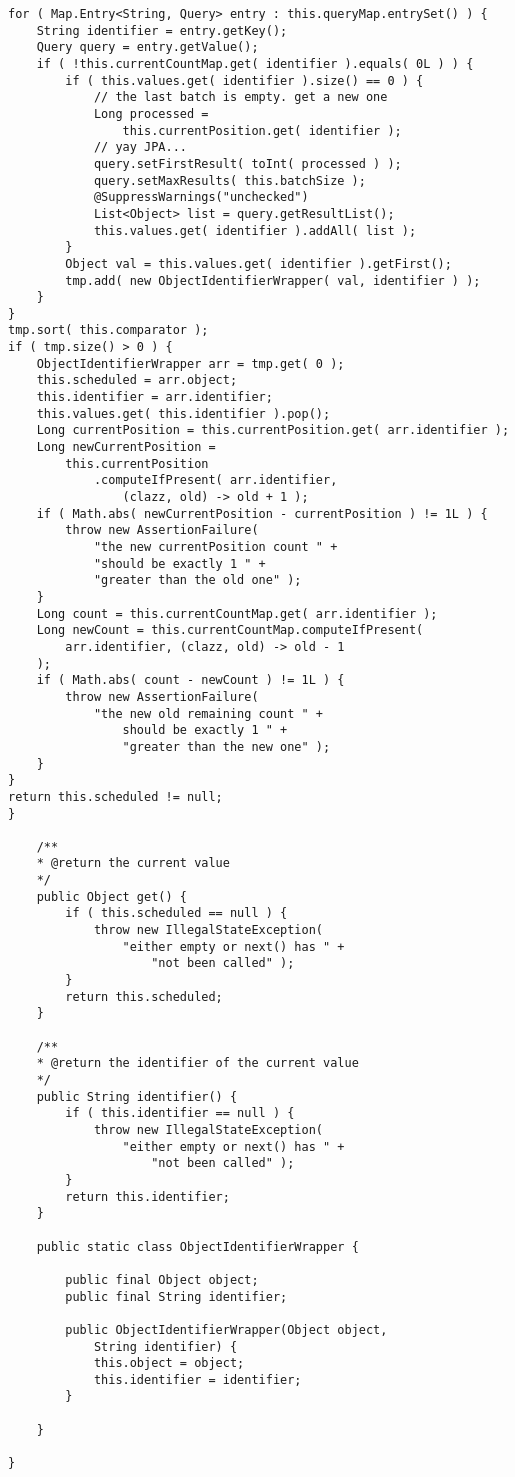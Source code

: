 \begin{lstlisting}[frame=htrbl, caption={MultiQueryAccess.java}, label={lst:MultiQueryAccess.java}]
for ( Map.Entry<String, Query> entry : this.queryMap.entrySet() ) {
	String identifier = entry.getKey();
	Query query = entry.getValue();
	if ( !this.currentCountMap.get( identifier ).equals( 0L ) ) {
		if ( this.values.get( identifier ).size() == 0 ) {
			// the last batch is empty. get a new one
			Long processed = 
				this.currentPosition.get( identifier );
			// yay JPA...
			query.setFirstResult( toInt( processed ) );
			query.setMaxResults( this.batchSize );
			@SuppressWarnings("unchecked")
			List<Object> list = query.getResultList();
			this.values.get( identifier ).addAll( list );
		}
		Object val = this.values.get( identifier ).getFirst();
		tmp.add( new ObjectIdentifierWrapper( val, identifier ) );
	}
}
tmp.sort( this.comparator );
if ( tmp.size() > 0 ) {
	ObjectIdentifierWrapper arr = tmp.get( 0 );
	this.scheduled = arr.object;
	this.identifier = arr.identifier;
	this.values.get( this.identifier ).pop();
	Long currentPosition = this.currentPosition.get( arr.identifier );
	Long newCurrentPosition = 
		this.currentPosition
			.computeIfPresent( arr.identifier, 
				(clazz, old) -> old + 1 );
	if ( Math.abs( newCurrentPosition - currentPosition ) != 1L ) {
		throw new AssertionFailure( 
			"the new currentPosition count " + 
			"should be exactly 1 " +
			"greater than the old one" );
	}
	Long count = this.currentCountMap.get( arr.identifier );
	Long newCount = this.currentCountMap.computeIfPresent(
		arr.identifier, (clazz, old) -> old - 1
	);
	if ( Math.abs( count - newCount ) != 1L ) {
		throw new AssertionFailure( 
			"the new old remaining count " + 
				should be exactly 1 " +
				"greater than the new one" );
	}
}
return this.scheduled != null;
}

	/**
	* @return the current value
	*/
	public Object get() {
		if ( this.scheduled == null ) {
			throw new IllegalStateException(
				"either empty or next() has " + 
					"not been called" );
		}
		return this.scheduled;
	}

	/**
	* @return the identifier of the current value
	*/
	public String identifier() {
		if ( this.identifier == null ) {
			throw new IllegalStateException( 
				"either empty or next() has " + 
					"not been called" );
		}
		return this.identifier;
	}

	public static class ObjectIdentifierWrapper {
	
		public final Object object;
		public final String identifier;
		
		public ObjectIdentifierWrapper(Object object,
			String identifier) {
			this.object = object;
			this.identifier = identifier;
		}
	
	}

}
\end{lstlisting}

\pagebreak

~